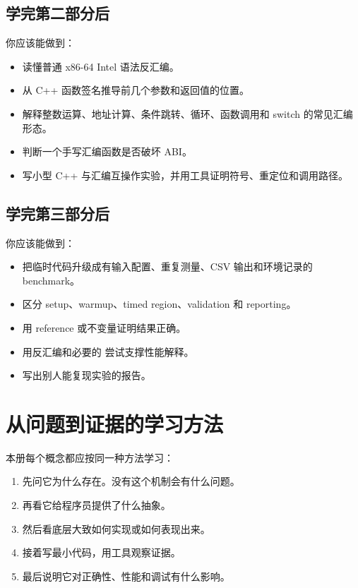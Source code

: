 \subsection*{学完第二部分后}

你应该能做到：

\begin{itemize}
  \item 读懂普通 x86-64 Intel 语法反汇编。
  \item 从 C++ 函数签名推导前几个参数和返回值的位置。
  \item 解释整数运算、地址计算、条件跳转、循环、函数调用和 switch 的常见汇编形态。
  \item 判断一个手写汇编函数是否破坏 ABI。
  \item 写小型 C++ 与汇编互操作实验，并用工具证明符号、重定位和调用路径。
\end{itemize}

\subsection*{学完第三部分后}

你应该能做到：

\begin{itemize}
  \item 把临时代码升级成有输入配置、重复测量、CSV 输出和环境记录的 benchmark。
  \item 区分 setup、warmup、timed region、validation 和 reporting。
  \item 用 reference 或不变量证明结果正确。
  \item 用反汇编和必要的  尝试支撑性能解释。
  \item 写出别人能复现实验的报告。
\end{itemize}

\section*{从问题到证据的学习方法}

本册每个概念都应按同一种方法学习：

\begin{enumerate}
  \item 先问它为什么存在。没有这个机制会有什么问题。
  \item 再看它给程序员提供了什么抽象。
  \item 然后看底层大致如何实现或如何表现出来。
  \item 接着写最小代码，用工具观察证据。
  \item 最后说明它对正确性、性能和调试有什么影响。
\end{enumerate}

